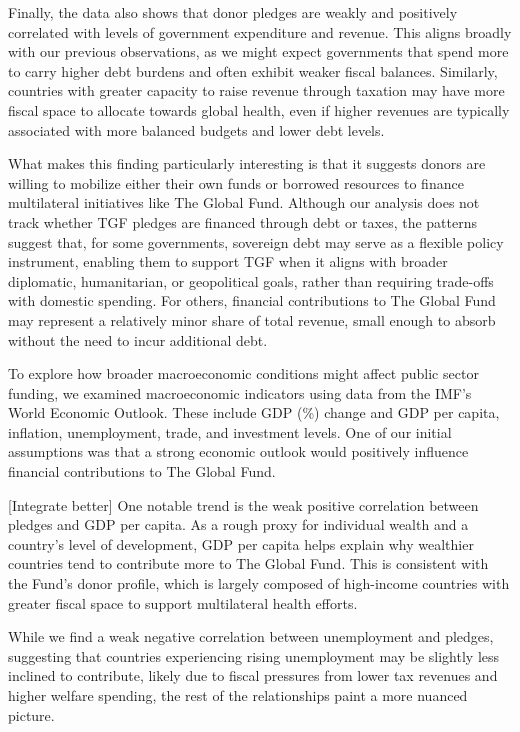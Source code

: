 \documentclass[
]{article}
\begin{document}
Finally, the data also shows that donor pledges are weakly and
positively correlated with levels of government expenditure and revenue.
This aligns broadly with our previous observations, as we might expect
governments that spend more to carry higher debt burdens and often
exhibit weaker fiscal balances. Similarly, countries with greater
capacity to raise revenue through taxation may have more fiscal space to
allocate towards global health, even if higher revenues are typically
associated with more balanced budgets and lower debt levels.

What makes this finding particularly interesting is that it suggests
donors are willing to mobilize either their own funds or borrowed
resources to finance multilateral initiatives like The Global Fund.
Although our analysis does not track whether TGF pledges are financed
through debt or taxes, the patterns suggest that, for some governments,
sovereign debt may serve as a flexible policy instrument, enabling them
to support TGF when it aligns with broader diplomatic, humanitarian, or
geopolitical goals, rather than requiring trade-offs with domestic
spending. For others, financial contributions to The Global Fund may
represent a relatively minor share of total revenue, small enough to
absorb without the need to incur additional debt.

To explore how broader macroeconomic conditions might affect public
sector funding, we examined macroeconomic indicators using data from the
IMF's World Economic Outlook. These include GDP (\%) change and GDP per
capita, inflation, unemployment, trade, and investment levels. One of
our initial assumptions was that a strong economic outlook would
positively influence financial contributions to The Global Fund.

{[}Integrate better{]} One notable trend is the weak positive
correlation between pledges and GDP per capita. As a rough proxy for
individual wealth and a country's level of development, GDP per capita
helps explain why wealthier countries tend to contribute more to The
Global Fund. This is consistent with the Fund's donor profile, which is
largely composed of high-income countries with greater fiscal space to
support multilateral health efforts.

While we find a weak negative correlation between unemployment and
pledges, suggesting that countries experiencing rising unemployment may
be slightly less inclined to contribute, likely due to fiscal pressures
from lower tax revenues and higher welfare spending, the rest of the
relationships paint a more nuanced picture.
\end{document}

